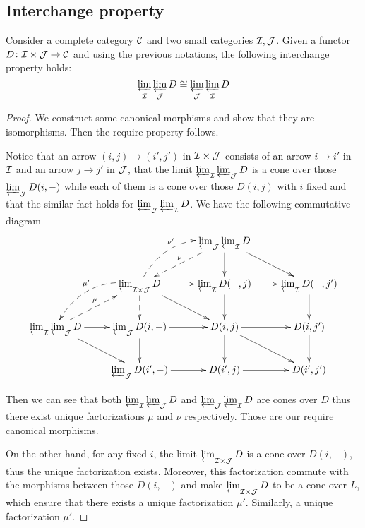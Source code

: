 \subsection{Interchange property}
  \begin{prop}\label{prop:interchange property of limits}
    Consider a complete category ${\cal C}$ and two small categories ${\cal I},{\cal J}$. Given a functor $D\colon{\cal I}\times{\cal J}\to{\cal C}$ and using the previous notations, the following interchange property holds:
    \begin{equation*}
      \operatorname*{\underleftarrow{\lim}}_{{\cal I}}\operatorname*{\underleftarrow{\lim}}_{{\cal J}} D \cong \operatorname*{\underleftarrow{\lim}}_{{\cal J}}\operatorname*{\underleftarrow{\lim}}_{{\cal I}} D
    \end{equation*}
  \end{prop}
  \begin{proof}
    We construct some canonical morphisms and show that they are isomorphisms. Then the require property follows.

    Notice that an arrow $(i,j)\to(i',j')$ in ${\cal I}\times{\cal J}$ consists of an arrow $i\to i'$ in ${\cal I}$ and an arrow $j\to j'$ in ${\cal J}$, that the limit $\operatorname*{\underleftarrow{\lim}}_{{\cal I}}\operatorname*{\underleftarrow{\lim}}_{{\cal J}} D$ is a cone over those $\operatorname*{\underleftarrow{\lim}}_{{\cal J}} D(i,-)$ while each of them is a cone over those $D(i,j)$ with $i$ fixed and that the similar fact holds for $\operatorname*{\underleftarrow{\lim}}_{{\cal J}}\operatorname*{\underleftarrow{\lim}}_{{\cal I}} D$. We have the following commutative diagram
  \begin{displaymath}
    \xymatrix{
      &&{\invlim_{\Jj}\invlim_{\Ii} D}\ar[d]\ar[dr]\ar@{-->}[dl]_{\nu}
      &\\
      &{\invlim_{\Ii\times\Jj} D}\ar[dr]\ar@{-->}[d]\ar@{-->}[r]\ar@{-->}@/_1.5pc/[dl]_{\mu'}\ar@{-->}@/^1.5pc/[ur]^{\nu'}
      &{\invlim_{\Ii} D(-,j)}\ar[d]\ar[r]
      &{\invlim_{\Ii} D(-,j')}\ar[d]
      \\{\invlim_{\Ii}\invlim_{\Jj} D}\ar[r]\ar[dr]\ar@{-->}[ur]^{\mu}
      &{\invlim_{\Jj} D(i,-)}\ar[r]\ar[d]
      &{D(i,j)}\ar[r]\ar[d]\ar[dr]
      &{D(i,j')}\ar[d]
      \\&{\invlim_{\Jj} D(i',-)}\ar[r]
      &{D(i',j)}\ar[r]
      &{D(i',j')}
    }
  \end{displaymath}

  Then we can see that both $\operatorname*{\underleftarrow{\lim}}_{{\cal I}}\operatorname*{\underleftarrow{\lim}}_{{\cal J}} D$ and $\operatorname*{\underleftarrow{\lim}}_{{\cal J}}\operatorname*{\underleftarrow{\lim}}_{{\cal I}} D$ are cones over $D$ thus there exist unique factorizations $\mu$ and $\nu$ respectively. Those are our require canonical morphisms.

  On the other hand, for any fixed $i$, the limit $\operatorname*{\underleftarrow{\lim}}_{{\cal I}\times{\cal J}} D$ is a cone over $D(i,-)$, thus the unique factorization exists. Moreover, this factorization commute with the morphisms between those $D(i,-)$ and make $\operatorname*{\underleftarrow{\lim}}_{{\cal I}\times{\cal J}} D$ to be a cone over $L$, which ensure that there exists a unique factorization $\mu'$. Similarly, a unique factorization $\mu'$.


\end{proof}
